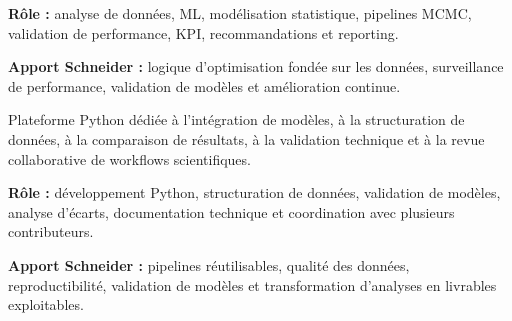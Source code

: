 \documentclass[8pt,a4paper,ragged2e,withhyper]{altacv}
\begin{document}
\textbf{Rôle :} analyse de données, ML, modélisation statistique, pipelines MCMC, validation de performance, KPI, recommandations et reporting.

\textbf{Apport Schneider :} logique d'optimisation fondée sur les données, surveillance de performance, validation de modèles et amélioration continue.

\divider


Plateforme Python dédiée à l'intégration de modèles, à la structuration de données, à la comparaison de résultats, à la validation technique et à la revue collaborative de workflows scientifiques.

\textbf{Rôle :} développement Python, structuration de données, validation de modèles, analyse d'écarts, documentation technique et coordination avec plusieurs contributeurs.

\textbf{Apport Schneider :} pipelines réutilisables, qualité des données, reproductibilité, validation de modèles et transformation d'analyses en livrables exploitables.


\vspace{-.3cm}


{\small
{}
}

\divider\smallskip
\vspace{-.3cm}


{\small
{}
}

\divider\smallskip
\vspace{-.3cm}
\end{document}
